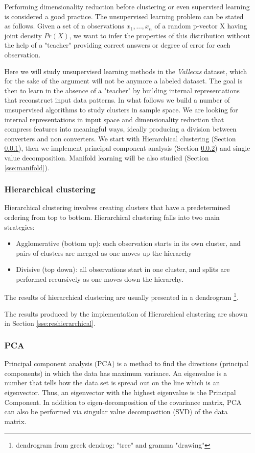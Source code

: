 \documentclass[11pt]{article}
\theoremstyle{definition}
\theoremstyle{remark}
\begin{document}
Performing dimensionality reduction before clustering or even supervised learning is considered a good practice. The unsupervised learning problem can be stated as follows. Given a set of n observations $x_1, ..., x_n$ of a random p-vector X having joint density $Pr(X)$, we want to infer the properties of this distribution without the help of a "teacher" providing correct answers or degree of error for each observation. %

Here we will study unsupervised learning methods in the \emph{Vallecas} dataset, which for the sake of the argument will not be anymore a labeled dataset. The goal is then to learn in the absence of a "teacher" by building internal representations that reconstruct input data patterns.
In what follows we build a number of unsupervised algorithms to study clusters in sample space. We are looking for internal representations in input space and dimensionality reduction that compress features into meaningful ways, ideally producing a division between converters and non converters. We start with Hierarchical clustering (Section \ref{sse:hierarchical}), then we implement principal component analysis (Section \ref{sse:PCA}) and single value decomposition. Manifold learning will be also studied (Section \ref{sse:manifold}). 


\subsubsection{Hierarchical clustering}
\label{sse:hierarchical}

Hierarchical clustering involves creating clusters that have a predetermined ordering from top to bottom. Hierarchical clustering falls into two main strategies: 
\begin{itemize}
	\item Agglomerative (bottom up): each observation starts in its own cluster, and pairs of clusters are merged as one moves up the hierarchy
	\item Divisive (top down): all observations start in one cluster, and splits are performed recursively as one moves down the hierarchy.
\end{itemize}
The results of hierarchical clustering are usually presented in a dendrogram \footnote{dendrogram from greek dendrog: "tree" and gramma "drawing"}.

The results produced by the implementation of Hierarchical clustering are shown in Section \ref{sse:reshierarchical}.

\subsubsection{PCA}
\label{sse:PCA}
Principal component analysis (PCA) is a method to find the directions (principal components) in which the data has maximum variance. An eigenvalue is a number that tells how the data set is spread out on the line which is an eigenvector. Thus, an eigenvector with the highest eigenvalue is the Principal Component. In addition to eigen-decomposition of the covariance matrix, PCA can also be performed via singular value decomposition (SVD) of the data matrix.
\end{document}
